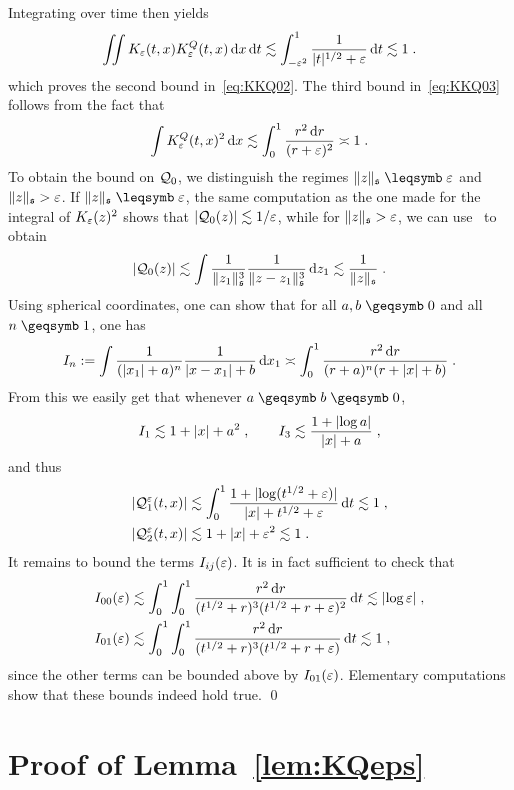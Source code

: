 \documentclass[reqno,11pt]{article}
\def\KQ{K^Q}
\def\fraks{\mathfrak{s}}
\begin{document}
Integrating over time then yields
\[
 \iint K_\eps(t,x)\KQ_\eps(t,x) \6x \6t 
 \lesssim \int_{-\eps^2}^1 \frac{1}{\abs{t}^{1/2}+\eps} \6t 
 \lesssim 1\;.
\]
which proves the second bound in~\eqref{eq:KKQ02}.
The third bound in~\eqref{eq:KKQ03} follows from the fact that 
\[
 \int \KQ_\eps(t,x)^2 \6x 
 \lesssim \int_0^1 \frac{r^2\6r}{(r+\eps)^2} \asymp 1\;.
\]
To obtain the bound on ${\mathcal Q}_0$, we distinguish the regimes
$\norm{z}_{\fraks}\leqs\eps$ and $\norm{z}_{\fraks}>\eps$. If
$\norm{z}_\fraks\leqs\eps$, the same computation as the one made for the
integral of $K_\varepsilon(z)^2$ shows that $\lvert{\mathcal Q}_0(z)\rvert\lesssim 1/\varepsilon$, while for
$\norm{z}_\fraks>\eps$, we can use~\cite[Lemma~10.14]{Hairer2014} to
obtain 
\[
 \abs{\cQ_0(z)} \lesssim \int \frac{1}{\norm{z_1}_\fraks^3}
\frac{1}{\norm{z-z_1}_\fraks^3}\6z_1 
\lesssim \frac{1}{\norm{z}_\fraks}\;.
\]
Using spherical coordinates, one can show that for all $a,b\geqs0$ and
all $n\geqs1$, one has 
\[
 I_n := \int \frac{1}{(\lvert x_1\rvert+a)^n} \frac{1}{\lvert x-x_1\rvert+b} \operatorname{d}\!x_1 
 \asymp \int_0^1 \frac{r^2\operatorname{d}\!r}{(r+a)^n(r+\lvert x\rvert+b)}\;.
\]
From this we easily get that whenever $a\geqs b\geqs0$,  
\[
 I_1 \lesssim 1 + \lvert x\rvert + a^2\;, \qquad 
 I_3 \lesssim \frac{1+\lvert\log a\rvert}{\lvert x\rvert+a}\;,
\] 
and thus 
\begin{align*}
 \lvert{\mathcal Q}_1^\varepsilon(t,x)\rvert &\lesssim \int_0^1
 \frac{1+\lvert\log(t^{1/2}+\varepsilon)\rvert}{\lvert x\rvert+t^{1/2}+\varepsilon} \operatorname{d}\!t \lesssim 1\;, \\
 \lvert{\mathcal Q}_2^\varepsilon(t,x)\rvert &\lesssim 1+\lvert x\rvert+\varepsilon^2 \lesssim 1\;.
\end{align*} 
It remains to bound the terms $I_{ij}(\varepsilon)$. It is in fact
sufficient to check that 
\begin{align*}
 I_{00}(\varepsilon) 
 &\lesssim \int_0^1\int_0^1
\frac{r^2\operatorname{d}\!r}{(t^{1/2}+r)^3(t^{1/2}+r+\varepsilon)^2}\operatorname{d}\!t
\lesssim \lvert\log\varepsilon\rvert\;, \\
 I_{01}(\varepsilon) 
 &\lesssim \int_0^1\int_0^1
\frac{r^2\operatorname{d}\!r}{(t^{1/2}+r)^3(t^{1/2}+r+\varepsilon)}\operatorname{d}\!t
\lesssim 1\;, 
\end{align*}
since the other terms can be bounded above by $I_{01}(\varepsilon)$. Elementary
computations show that these bounds indeed hold true.
\qed



\section{Proof of Lemma~\ref{lem:KQeps}}
\label{app_proof_KQeps}
\end{document}
